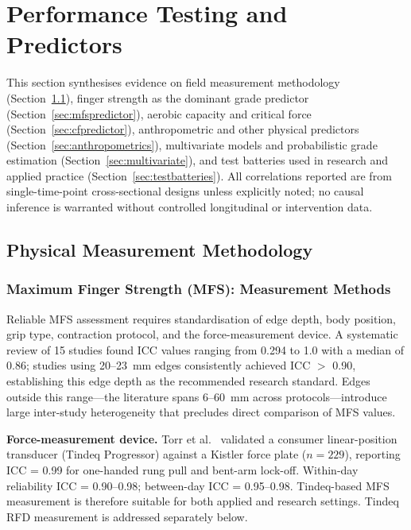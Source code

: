 
\section{Performance Testing and Predictors}
\label{sec:predictors}

This section synthesises evidence on field measurement methodology (Section~\ref{sec:ptestmeasure}), finger strength as the dominant grade predictor (Section~\ref{sec:mfspredictor}), aerobic capacity and critical force (Section~\ref{sec:cfpredictor}), anthropometric and other physical predictors (Section~\ref{sec:anthropometrics}), multivariate models and probabilistic grade estimation (Section~\ref{sec:multivariate}), and test batteries used in research and applied practice (Section~\ref{sec:testbatteries}). All correlations reported are from single-time-point cross-sectional designs unless explicitly noted; no causal inference is warranted without controlled longitudinal or intervention data.

\subsection{Physical Measurement Methodology}
\label{sec:ptestmeasure}

\subsubsection{Maximum Finger Strength (MFS): Measurement Methods}

Reliable MFS assessment requires standardisation of edge depth, body position, grip type, contraction protocol, and the force-measurement device. A systematic review of 15 studies \cite{TEMP_Jullien2025} found ICC values ranging from 0.294 to 1.0 with a median of 0.86; studies using 20--23~mm edges consistently achieved ICC $>$ 0.90, establishing this edge depth as the recommended research standard. Edges outside this range---the literature spans 6--60~mm across protocols---introduce large inter-study heterogeneity that precludes direct comparison of MFS values.

\medskip
\noindent\textbf{Force-measurement device.} Torr et al.\ \cite{TEMP_Torr2022} validated a consumer linear-position transducer (Tindeq Progressor) against a Kistler force plate ($n = 229$), reporting ICC = 0.99 for one-handed rung pull and bent-arm lock-off. Within-day reliability ICC = 0.90--0.98; between-day ICC = 0.95--0.98. Tindeq-based MFS measurement is therefore suitable for both applied and research settings. Tindeq RFD measurement is addressed separately below.

